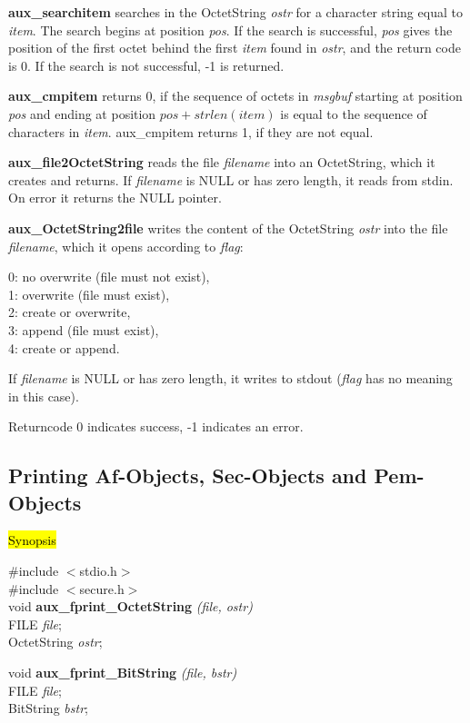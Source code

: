 {\bf aux\_searchitem}
searches in the OctetString {\em ostr} for a character string equal to
{\em item}. The search begins at position {\em *pos}.
If the search is successful, {\em *pos} gives the position
of the first octet behind the first
{\em item} found in {\em ostr}, and the return code is 0.
If the search is not successful, -1 is returned.

{\bf aux\_cmpitem} returns 0, if the sequence of octets in {\em msgbuf}
starting at position {\em pos} and ending at position
$pos+strlen(item)$
is equal to the sequence of characters in {\em item}.
aux\_cmpitem returns 1, if they are not equal.

{\bf aux\_file2OctetString} reads the file {\em filename} into
an OctetString, which it creates and returns. If {\em filename}
is NULL or has zero length, it reads from stdin.
On error it returns the NULL pointer.

{\bf aux\_OctetString2file} writes the content of the OctetString
{\em ostr} into the file {\em filename},
which it opens according to {\em flag}:
 
0: no overwrite (file must not exist), \\
1: overwrite (file must exist), \\
2: create or overwrite, \\
3: append (file must exist), \\
4: create or append.
 
If {\em filename} is NULL or has zero length, it writes
to stdout ({\em flag} has no meaning in this case).
 
Returncode 0 indicates success, -1 indicates an error.

\subsection{Printing Af-Objects, Sec-Objects and Pem-Objects}
\label{aux_printostring}
\hl{Synopsis}

\#include $<$stdio.h$>$ \\
\#include $<$secure.h$>$ \\ [1em]
void {\bf aux\_fprint\_OctetString} {\em (file, ostr)} \\
FILE {\em *file}; \\
OctetString {\em *ostr};

void {\bf aux\_fprint\_BitString} {\em (file, bstr)} \\
FILE {\em *file}; \\
BitString {\em *bstr};


